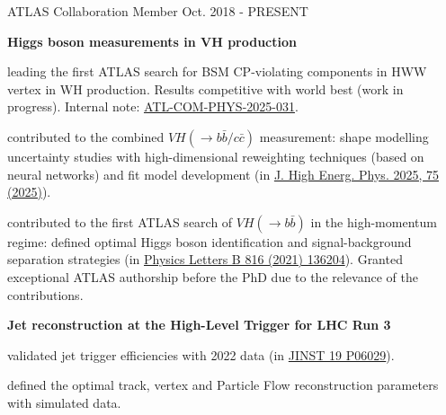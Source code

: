 \begin{cventries}
    \cventry
    {ATLAS Collaboration}
    {Member}
    {}
    {Oct. 2018 - PRESENT}
    {
        \textbf{Higgs boson measurements in VH production}\vspace{14pt}
        \begin{cvitems}
            \item {leading the first ATLAS search for BSM CP-violating components in HWW vertex in WH production. Results competitive with world best (work in progress). Internal note: \href{https://cds.cern.ch/record/2921718}{ATL-COM-PHYS-2025-031}.}
            \item {contributed to the combined $VH(\to b\bar{b}/c\bar{c})$ measurement: shape modelling uncertainty studies with high-dimensional reweighting techniques (based on neural networks) and fit model development (in \href{https://doi.org/10.1007/JHEP04(2025)075}{J. High Energ. Phys. 2025, 75 (2025)}).}
            \item {contributed to the first ATLAS search of $VH(\to b\bar{b})$ in the high-momentum regime: defined optimal Higgs boson identification and signal-background separation strategies (in \href{https://doi.org/10.1016/j.physletb.2021.136204}{Physics Letters B 816 (2021) 136204}). Granted exceptional ATLAS authorship before the PhD due to the relevance of the contributions.}
        \end{cvitems}\vspace{19pt}
        \textbf{Jet reconstruction at the High-Level Trigger for LHC Run 3}\vspace{14pt}
        \begin{cvitems}
            \item {validated jet trigger efficiencies with 2022 data (in \href{https://doi.org/10.1088/1748-0221/19/06/P06029}{JINST 19 P06029}).}
            \item {defined the optimal track, vertex and Particle Flow reconstruction parameters with simulated data.}
        \end{cvitems}
    }

\end{cventries}

